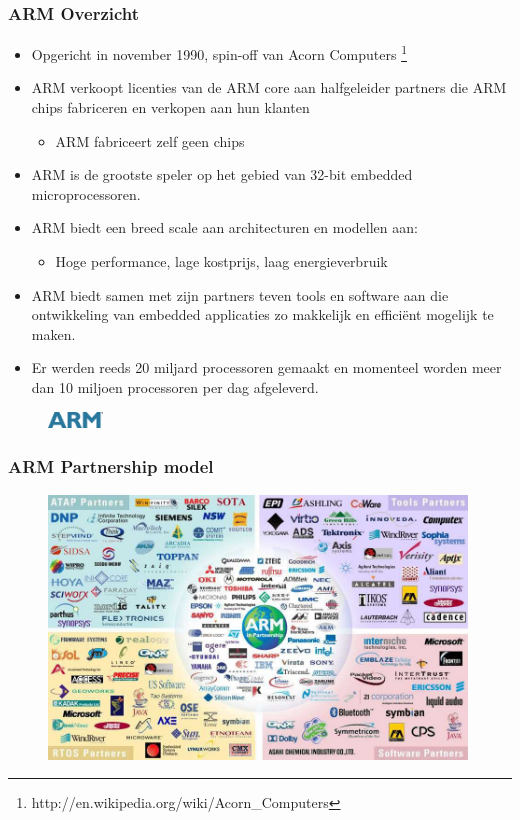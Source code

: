 \documentclass{beamer}
\begin{document}
\begin{frame} 
\frametitle{ARM Overzicht}

\begin{itemize}
 \item <1-> Opgericht in november 1990, spin-off van Acorn Computers \footnote{http://en.wikipedia.org/wiki/Acorn\_Computers}
 \item <2-> ARM verkoopt licenties van de ARM core aan halfgeleider partners die ARM chips fabriceren en verkopen aan hun klanten
  \begin{itemize}
    \item ARM fabriceert zelf geen chips
    \end{itemize}
 \item <3-> ARM is de grootste speler op het gebied van 32-bit embedded microprocessoren.
 \item <4-> ARM biedt een breed scale aan architecturen en modellen aan:
      \begin{itemize}
	\item Hoge performance, lage kostprijs, laag energieverbruik
      \end{itemize}
 \item <5-> ARM biedt samen met zijn partners teven tools en software aan die ontwikkeling van embedded applicaties zo makkelijk en effici\"ent mogelijk te maken.
 \item <6-> Er werden reeds 20 miljard processoren gemaakt en momenteel worden meer dan 10 miljoen processoren per dag afgeleverd. 
\end{itemize}
\begin{figure}[h] \begin{center}
\includegraphics[width=0.13\textwidth]{figures/armlogo.jpg}
\end{center} \end{figure}
\end{frame}

\begin{frame} 
\frametitle{ARM Partnership model}
\begin{figure}[h] \begin{center}
\includegraphics[width=0.99\textwidth]{figures/armpartners.jpeg}
\end{center} \end{figure}
\end{frame}
\end{document}
